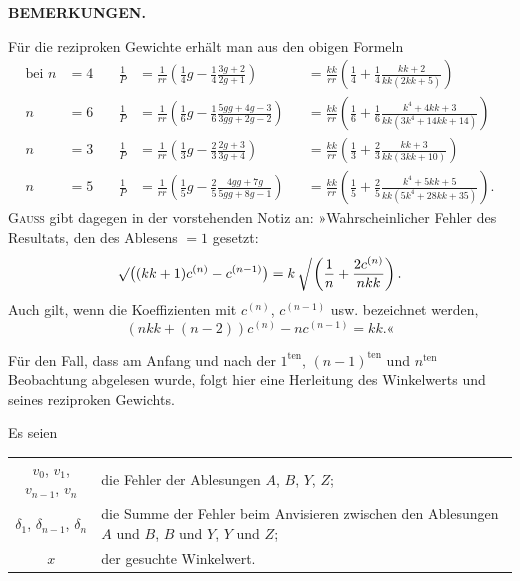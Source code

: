 \par\clearpage
\noindent{}\hfill{\small\textbf{BEMERKUNGEN.}}\hfill\null\par\medskip

Für die reziproken Gewichte erhält man aus den obigen Formeln
\[
\begin{alignedat}{3}
 \text{bei }n&=4\quad&
 \frac{1}{P}&=\frac{1}{rr}\left(\tfrac14g-\tfrac14\frac{3g+2}{2g+1}\right)&
 &=\frac{kk}{rr}\left(\tfrac14+\tfrac14\frac{kk+2}{kk(2kk+5)}\right)\\
 n&=6&
 \frac{1}{P}&=\frac{1}{rr}\left(\tfrac16g-\tfrac16\frac{5gg+4g-3}{3gg+2g-2}\right)&
 &=\frac{kk}{rr}\left(\tfrac16+\tfrac16\frac{k^4+4kk+3}{kk(3k^4+14kk+14)}\right)\\
 n&=3&
 \frac{1}{P}&=\frac{1}{rr}\left(\tfrac13g-\tfrac23\frac{2g+3}{3g+4}\right)&
 &=\frac{kk}{rr}\left(\tfrac13+\tfrac23\frac{kk+3}{kk(3kk+10)}\right)\\
 n&=5&
 \frac{1}{P}&=\frac{1}{rr}\left(\tfrac15g-\tfrac25\frac{4gg+7g}{5gg+8g-1}\right)&
 &=\frac{kk}{rr}\left(\tfrac15+\tfrac25\frac{k^4+5kk+5}{kk(5k^4+28kk+35)}\right).
\end{alignedat}
\]
\textsc{Gauss} gibt dagegen in der vorstehenden Notiz an: »Wahrscheinlicher Fehler des Resultats, den des Ablesens $=1$ gesetzt:
\[
 \surd\bigl((kk+1)c^{(n)}-c^{(n-1)}\bigr)
 =k\left\delimiter"270370\relax\vphantom{\frac{1}{n}}\right.\!
 \left(\frac{1}{n}+\frac{2c^{(n)}}{nkk}\right).
\]
\indent Auch gilt, wenn die Koeffizienten mit $c^{(n)}$, $c^{(n-1)}$ usw. bezeichnet werden,
\[
 (nkk+(n-2))c^{(n)}-nc^{(n-1)}=kk.\text{«}
\]

Für den Fall, dass am Anfang und nach der $1^{\text{ten}}$, $(n-1)^{\text{ten}}$ und $n^{\text{ten}}$ Beobachtung abgelesen wurde, folgt hier eine Herleitung des Winkelwerts und seines reziproken Gewichts.

Es seien\par
\noindent
\begin{tabular}{@{}c@{\quad}p{.80\linewidth}@{}}
 $v_0$, $v_1$, $v_{n-1}$, $v_n$ & die Fehler der Ablesungen $A$, $B$, $Y$, $Z$;\\
 $\delta_1$, $\delta_{n-1}$, $\delta_n$ & die Summe der Fehler beim Anvisieren zwischen den Ablesungen $A$ und $B$, $B$ und $Y$, $Y$ und $Z$;\\
 $x$ & der gesuchte Winkelwert.
\end{tabular}\par

